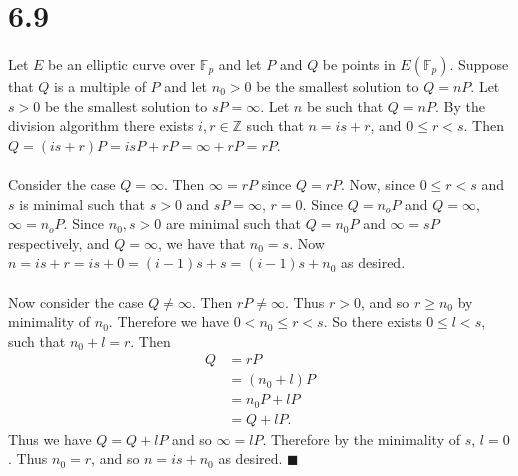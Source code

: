 \documentclass[letterpaper,12pt,oneside,onecolumn]{report}
\begin{document}
\section*{6.9}
\paragraph{}
Let $E$ be an elliptic curve over $\mathbb{F}_p$ and let $P$ and $Q$ be points in $E(\mathbb{F}_p)$. Suppose that $Q$ is a multiple of $P$ and let $n_0 > 0$ be the smallest solution to $Q = nP$. Let $s > 0$ be the smallest solution to $sP = \infty$. Let $n$ be such that $Q = nP$. By the division algorithm there exists $i, r \in \mathbb{Z}$ such that $n= is + r$, and $0 \leq r < s$. Then $Q = (is + r)P = isP + rP = \infty + rP = rP$.
\paragraph{}
Consider the case $Q = \infty$. Then $\infty = rP$ since $Q = rP$. Now, since $0 \leq r < s$ and $s$ is minimal such that $s>0$ and $sP = \infty$, $r = 0$. Since $Q = n_oP$ and $Q = \infty$, $\infty = n_oP$. Since $n_0, s > 0$ are minimal such that $Q = n_0P$ and $\infty = sP$ respectively, and $Q = \infty$, we have that $n_0 = s$. Now $n = is + r = is + 0 = (i-1)s + s = (i-1)s + n_0$ as desired.
\paragraph{}
Now consider the case $Q \neq \infty$. Then $rP \neq \infty$. Thus $r > 0$, and so $r \geq n_0$ by minimality of $n_0$. Therefore we have $0 < n_0 \leq r < s$. So there exists $0 \leq l < s$, such that $n_0 + l = r$. Then
\begin{align*}
Q &= rP \\
&= (n_0 + l)P \\
&= n_0P + lP \\
&= Q + lP.
\end{align*}
Thus we have $Q = Q + lP$ and so $\infty = lP$. Therefore by the minimality of $s$, $l = 0$. Thus $n_0 = r$, and so $n = is + n_0$ as desired. $\blacksquare$
\end{document}
